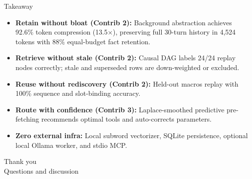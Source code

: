 \documentclass[aspectratio=169,10pt]{beamer}
\begin{document}

\begin{frame}{Takeaway}
  \begin{itemize}
    \item \textbf{Retain without bloat (Contrib 2):} Background abstraction achieves 92.6\% token compression (13.5$\times$), preserving full 30-turn history in 4,524 tokens with 88\% equal-budget fact retention.
    \item \textbf{Retrieve without stale (Contrib 2):} Causal DAG labels 24/24 replay nodes correctly; stale and superseded rows are down-weighted or excluded.
    \item \textbf{Reuse without rediscovery (Contrib 2):} Held-out macros replay with 100\% sequence and slot-binding accuracy.
    \item \textbf{Route with confidence (Contrib 3):} Laplace-smoothed predictive pre-fetching recommends optimal tools and auto-corrects parameters.
    \item \textbf{Zero external infra:} Local subword vectorizer, SQLite persistence, optional local Ollama worker, and stdio MCP.
  \end{itemize}
  \vspace{1.2em}
  \centering
  {\Large Thank you}\\[2pt]
  {\small Questions and discussion}
\end{frame}
\end{document}
